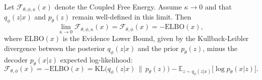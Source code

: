 \documentclass[twoside,11pt]{article}
\begin{document}
\begin{theorem}
\label{thm:GaussianLimit}
Let $\mathcal{F}_{\theta,\phi,\kappa}(x)$ denote the Coupled Free Energy.
Assume $\kappa \to 0$ and that $q_\phi(z|x)$ and $p_\theta(z)$
remain well-defined in this limit. Then
\[
\lim_{\kappa \to 0}
\mathcal{F}_{\theta,\phi,\kappa}(x)
=\mathcal{F}_{\theta,\phi}(x)
=-\mathrm{ELBO}(x),
\]
where $\mathrm{ELBO}(x)$ is the Evidence Lower Bound, given by the Kullback-Leibler divergence between the posterior $q_\phi(z|x)$ and the prior $p_\theta(z)$, minus the decoder $p_\theta(x|z)$ expected log-likelihood:
\[
\mathcal{F}_{\theta,\phi}(x)
=-\mathrm{ELBO}(x)
=
\mathrm{KL}\big(q_\phi(z|x)\,\|\,p_\theta(z)\big)
-
\mathbb{E}_{z\sim q_\phi(z|x)}
\big[\log p_\theta(x|z)\big].
\]
\end{theorem}
\end{document}
